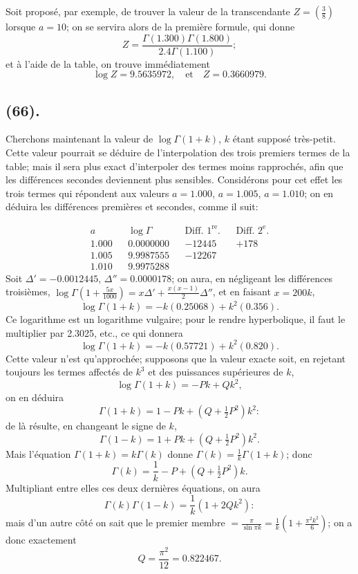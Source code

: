 \documentclass{article}
\begin{document}
Soit proposé, par exemple, de trouver la valeur de la transcendante $Z=\left(\frac{3}{8}\right)$ lorsque $a=10$; on se servira alors de la première formule, qui donne
\[ Z=\frac{\Gamma(1.300)\Gamma(1.800)}{2.4\Gamma(1.100)}; \]
et à l'aide de la table, on trouve immédiatement
\[ \log Z=9.5635972,\quad\text{et}\quad Z=0.3660979. \]

\subsection*{(66).}

Cherchons maintenant la valeur de $\log\Gamma(1+k)$, $k$ étant supposé très-petit. Cette valeur pourrait se déduire de l'interpolation des trois premiers termes de la table; mais il sera plus exact d'interpoler des termes moins rapprochés, afin que les différences secondes deviennent plus sensibles. Considérons pour cet effet les trois termes qui répondent aux valeurs $a=1.000$, $a=1.005$, $a=1.010$; on en déduira les différences premières et secondes, comme il suit:

\[ \begin{aligned} a && \log\Gamma && \text{Diff. }1^{\text{re}}. && \text{Diff. }2^{\text{e}}.\\ 1.000 && 0.0000000 && -12445 && +178\\ 1.005 && 9.9987555 && -12267 &&\\ 1.010 && 9.9975288 && && \end{aligned} \]
Soit $\Delta'=-0.0012445$, $\Delta''=0.0000178$; on aura, en négligeant les différences troisièmes, $\log\Gamma\left(1+\frac{5x}{1000}\right)=x\Delta'+\frac{x(x-1)}{2}\Delta''$, et en faisant $x=200k$,
\[ \log\Gamma(1+k)=-k(0.25068)+k^{2}(0.356). \]
Ce logarithme est un logarithme vulgaire; pour le rendre hyperbolique, il faut le multiplier par 2.3025, etc., ce qui donnera
\[ \log\Gamma(1+k)=-k(0.57721)+k^{2}(0.820). \]
Cette valeur n'est qu'approchée; supposons que la valeur exacte soit, en rejetant toujours les termes affectés de $k^{3}$ et des puissances supérieures de $k$,
\[ \log\Gamma(1+k)=-Pk+Qk^{2}, \]
on en déduira
\[ \Gamma(1+k)=1-Pk+(Q+\tfrac{1}{2}P^{2})k^{2}: \]
de là résulte, en changeant le signe de $k$,
\[ \Gamma(1-k)=1+Pk+(Q+\tfrac{1}{2}P^{2})k^{2}. \]
Mais l'équation $\Gamma(1+k)=k\Gamma(k)$ donne $\Gamma(k)=\frac{1}{k}\Gamma(1+k)$; donc
\[ \Gamma(k)=\frac{1}{k}-P+(Q+\tfrac{1}{2}P^{2})k. \]
Multipliant entre elles ces deux dernières équations, on aura
\[ \Gamma(k)\Gamma(1-k)=\frac{1}{k}(1+2Qk^{2}): \]
mais d'un autre côté on sait que le premier membre $=\frac{\pi}{\sin\pi k}=\frac{1}{k}\left(1+\frac{\pi^{2}k^{2}}{6}\right)$; on a donc exactement
\[ Q=\frac{\pi^{2}}{12}=0.822467. \]
\end{document}
